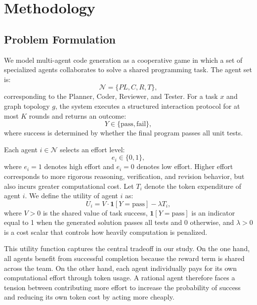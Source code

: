 \documentclass[manuscript,screen,review]{acmart}
\begin{document}
\section{Methodology}
\subsection{Problem Formulation}

We model multi-agent code generation as a cooperative game in which a set of specialized agents collaborates to solve a shared programming task. The agent set is:
\begin{equation}
\mathcal{N} = \{PL, C, R, T\},
\end{equation}
corresponding to the Planner, Coder, Reviewer, and Tester. For a task $x$ and graph topology $g$, the system executes a structured interaction protocol for at most $K$ rounds and returns an outcome:
\begin{equation}
Y \in \{\text{pass}, \text{fail}\},
\end{equation}
where success is determined by whether the final program passes all unit tests.

Each agent $i \in \mathcal{N}$ selects an effort level:
\begin{equation}
e_i \in \{0, 1\},
\end{equation}
where $e_i = 1$ denotes high effort and $e_i = 0$ denotes low effort. Higher effort corresponds to more rigorous reasoning, verification, and revision behavior, but also incurs greater computational cost. Let $T_i$ denote the token expenditure of agent $i$. We define the utility of agent $i$ as:
\begin{equation}
U_i = V \cdot \mathbf{1}[Y=\text{pass}] - \lambda T_i,
\end{equation}
where $V > 0$ is the shared value of task success, $\mathbf{1}[Y=\text{pass}]$ is an indicator equal to 1 when the generated solution passes all tests and 0 otherwise, and $\lambda > 0$ is a cost scalar that controls how heavily computation is penalized.

This utility function captures the central tradeoff in our study. On the one hand, all agents benefit from successful completion because the reward term is shared across the team. On the other hand, each agent individually pays for its own computational effort through token usage. A rational agent therefore faces a tension between contributing more effort to increase the probability of success and reducing its own token cost by acting more cheaply.
\end{document}
